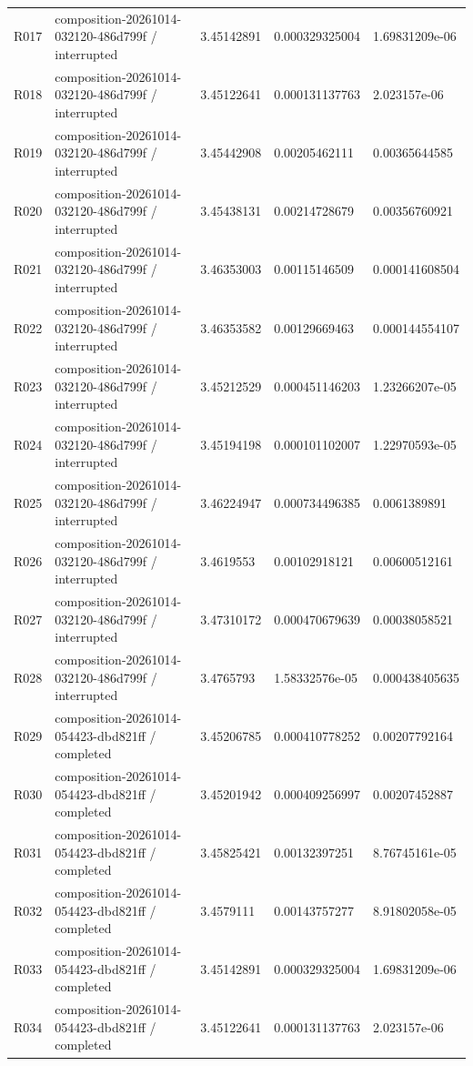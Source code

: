 \documentclass[10pt]{article}
\begin{document}
{\begin{longtable}{p{}p{}p{}p{}p{}}
R017 & composition-20261014-032120-486d799f / interrupted & 3.45142891 & 0.000329325004 & 1.69831209e-06 \\
R018 & composition-20261014-032120-486d799f / interrupted & 3.45122641 & 0.000131137763 & 2.023157e-06 \\
R019 & composition-20261014-032120-486d799f / interrupted & 3.45442908 & 0.00205462111 & 0.00365644585 \\
R020 & composition-20261014-032120-486d799f / interrupted & 3.45438131 & 0.00214728679 & 0.00356760921 \\
R021 & composition-20261014-032120-486d799f / interrupted & 3.46353003 & 0.00115146509 & 0.000141608504 \\
R022 & composition-20261014-032120-486d799f / interrupted & 3.46353582 & 0.00129669463 & 0.000144554107 \\
R023 & composition-20261014-032120-486d799f / interrupted & 3.45212529 & 0.000451146203 & 1.23266207e-05 \\
R024 & composition-20261014-032120-486d799f / interrupted & 3.45194198 & 0.000101102007 & 1.22970593e-05 \\
R025 & composition-20261014-032120-486d799f / interrupted & 3.46224947 & 0.000734496385 & 0.0061389891 \\
R026 & composition-20261014-032120-486d799f / interrupted & 3.4619553 & 0.00102918121 & 0.00600512161 \\
R027 & composition-20261014-032120-486d799f / interrupted & 3.47310172 & 0.000470679639 & 0.00038058521 \\
R028 & composition-20261014-032120-486d799f / interrupted & 3.4765793 & 1.58332576e-05 & 0.000438405635 \\
R029 & composition-20261014-054423-dbd821ff / completed & 3.45206785 & 0.000410778252 & 0.00207792164 \\
R030 & composition-20261014-054423-dbd821ff / completed & 3.45201942 & 0.000409256997 & 0.00207452887 \\
R031 & composition-20261014-054423-dbd821ff / completed & 3.45825421 & 0.00132397251 & 8.76745161e-05 \\
R032 & composition-20261014-054423-dbd821ff / completed & 3.4579111 & 0.00143757277 & 8.91802058e-05 \\
R033 & composition-20261014-054423-dbd821ff / completed & 3.45142891 & 0.000329325004 & 1.69831209e-06 \\
R034 & composition-20261014-054423-dbd821ff / completed & 3.45122641 & 0.000131137763 & 2.023157e-06 \\

\end{longtable}}
\end{document}
